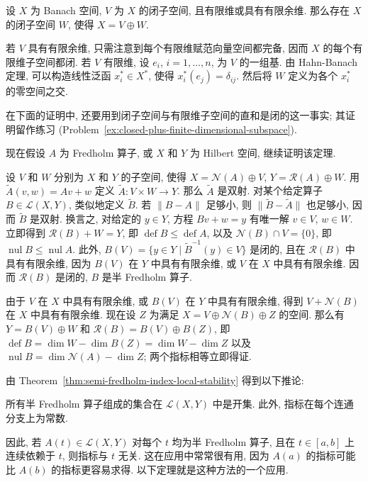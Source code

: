 \begin{Lemma}
\label{lem:finite-dimension-or-codimension-closed-complement}
设 $X$ 为 Banach 空间, $V$ 为 $X$ 的闭子空间, 且有限维或具有有限余维. 那么存在 $X$ 的闭子空间 $W$, 使得 $X=V\oplus W$.
\end{Lemma}

\begin{Proof}
若 $V$ 具有有限余维, 只需注意到每个有限维赋范向量空间都完备, 因而 $X$ 的每个有限维子空间都闭. 若 $V$ 有限维, 设 $e_i$, $i=1,\ldots,n$, 为 $V$ 的一组基. 由 Hahn-Banach 定理, 可以构造线性泛函 $x_i^*\in X^*$, 使得 $x_i^*(e_j)=\delta_{ij}$. 然后将 $W$ 定义为各个 $x_i^*$ 的零空间之交.
\end{Proof}

在下面的证明中, 还要用到闭子空间与有限维子空间的直和是闭的这一事实; 其证明留作练习 (Problem~\ref{ex:closed-plus-finite-dimensional-subspace}).

现在假设 $A$ 为 Fredholm 算子, 或 $X$ 和 $Y$ 为 Hilbert 空间, 继续证明该定理.

\begin{Proof}
设 $V$ 和 $W$ 分别为 $X$ 和 $Y$ 的子空间, 使得 $X=\mathcal{N}(A)\oplus V$, $Y=\mathcal{R}(A)\oplus W$. 用 $\widetilde A(v,w)=Av+w$ 定义 $\widetilde A:V\times W\to Y$. 那么 $\widetilde A$ 是双射. 对某个给定算子 $B\in\mathcal{L}(X,Y)$, 类似地定义 $\widetilde B$. 若 $\|B-A\|$ 足够小, 则 $\|\widetilde B-\widetilde A\|$ 也足够小, 因而 $\widetilde B$ 是双射. 换言之, 对给定的 $y\in Y$, 方程 $Bv+w=y$ 有唯一解 $v\in V$, $w\in W$. 立即得到 $\mathcal{R}(B)+W=Y$, 即 $\operatorname{def}B\leq\operatorname{def}A$, 以及 $\mathcal{N}(B)\cap V=\{0\}$, 即 $\operatorname{nul}B\leq\operatorname{nul}A$. 此外, $B(V)=\{y\in Y\mid\widetilde B^{-1}(y)\in V\}$ 是闭的, 且在 $\mathcal{R}(B)$ 中具有有限余维, 因为 $B(V)$ 在 $Y$ 中具有有限余维, 或 $V$ 在 $X$ 中具有有限余维. 因而 $\mathcal{R}(B)$ 是闭的, $B$ 是半 Fredholm 算子.

由于 $V$ 在 $X$ 中具有有限余维, 或 $B(V)$ 在 $Y$ 中具有有限余维, 得到 $V+\mathcal{N}(B)$ 在 $X$ 中具有有限余维. 现在设 $Z$ 为满足 $X=V\oplus\mathcal{N}(B)\oplus Z$ 的空间. 那么有 $Y=B(V)\oplus W$ 和 $\mathcal{R}(B)=B(V)\oplus B(Z)$, 即 $\operatorname{def}B=\dim W-\dim B(Z)=\dim W-\dim Z$ 以及 $\operatorname{nul}B=\dim\mathcal{N}(A)-\dim Z$; 两个指标相等立即得证.
\end{Proof}

由 Theorem~\ref{thm:semi-fredholm-index-local-stability} 得到以下推论:

\begin{Corollary}
\label{cor:semi-fredholm-open-set-constant-index}
所有半 Fredholm 算子组成的集合在 $\mathcal{L}(X,Y)$ 中是开集. 此外, 指标在每个连通分支上为常数.
\end{Corollary}

因此, 若 $A(t)\in\mathcal{L}(X,Y)$ 对每个 $t$ 均为半 Fredholm 算子, 且在 $t\in[a,b]$ 上连续依赖于 $t$, 则指标与 $t$ 无关. 这在应用中常常很有用, 因为 $A(a)$ 的指标可能比 $A(b)$ 的指标更容易求得. 以下定理就是这种方法的一个应用.
